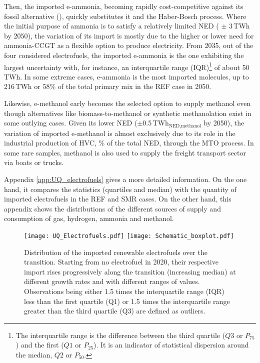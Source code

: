 Then, the imported e-ammonia, becoming rapidly cost-competitive against its fossil alternative (), quickly substitutes it and the Haber-Bosch process. Where the initial purpose of ammonia is to satisfy a relatively limited \acrfull{NED} ( $\pm$ 3\,TWh by 2050), the variation of its import is mostly due to the higher or lower need for ammonia-\gls{CCGT} as a flexible option to produce electricity. From 2035, out of the four considered electrofuels, the imported e-ammonia is the one exhibiting the largest uncertainty with, for instance, an interquartile range (IQR)\footnote{The interquartile range is the difference between the third quartile ($Q3$ or $P_{75}$) and the first ($Q1$ or $P_{25}$). It is an indicator of statistical dispersion around the median, $Q2$ or $P_{50}$.} of about 50\,TWh. In some extreme cases, e-ammonia is the most imported molecules, \ie up to 216\,TWh or 58\% of the total primary mix in the REF case in 2050. 

Likewise, e-methanol early becomes the selected option to supply methanol even though alternatives like biomass-to-methanol or synthetic methanolation exist in some outlying cases. Given its lower \gls{NED} ($\pm$0.5\,TWh$_{\text{NED,methanol}}$ by 2050), the variation of imported e-methanol is almost exclusively due to its role in the industrial production of \gls{HVC}, \% of the total \gls{NED}, through the \acrfull{MTO} process. In some rare samples, methanol is also used to supply the freight transport sector via boats or trucks.

Appendix \ref{app:UQ_electrofuels} gives a more detailed information. On the one hand, it compares the statistics (\ie quartiles and median) with the quantity of imported electrofuels in the REF and SMR cases. On the other hand, this appendix shows the distributions of the different sources of supply and consumption of gas, hydrogen, ammonia and methanol.

\begin{figure}[htbp!]
\centering
\texttt{[image: UQ\_Electrofuels.pdf]}
\texttt{[image: Schematic\_boxplot.pdf]}
\caption{Distribution of the imported renewable electrofuels over the transition. Starting from no electrofuel in 2020, their respective import rises progressively along the transition (\ie increasing median) at different growth rates and with different ranges of values. Observations being either 1.5 times the interquartile range (IQR) less than the first quartile (Q1) or 1.5 times the interquartile range greater than the third quartile (Q3) are defined as outliers.}
\label{fig:results_uq_electrofuels}
\end{figure}

